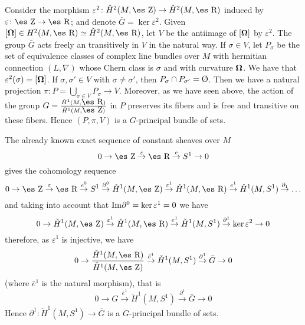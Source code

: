 \documentclass[12pt]{article}
\theoremstyle{plain}
\def\dst{\(}
\def\map#1{\mathrel{\mathop{\to}\limits^{#1}}}
\def\buit{\hbox{\rm\O}}
\def\curv{{\bf \Omega}}
\def\Zahl{\mbox{\es Z}}
\def\Real{\mbox{\es R}}
\begin{document}
Consider the morphism
$\varepsilon^2 \colon \check H^2(M,\Zahl ) \to \check H^2(M,\Real )$
induced by $\varepsilon \colon \Zahl \to \Real$;
and denote $\bar G = \ker \varepsilon^2$.
Given $[\curv ] \in H^2(M,\Real ) \simeq \check H^2(M,\Real )$,
let $V$ be the antiimage of $[\curv ]$ by $\varepsilon^2$.
The group $\bar G$ acts freely an transitively in $V$ in the natural
way.
If $\sigma \in V$, let $P_\sigma$ be
the set of equivalence classes of complex line bundles
over $M$ with hermitian connection $(L,\nabla )$
whose Chern class is $\sigma$ and with curvature $\curv$.
We have that $\varepsilon^2(\sigma ) = [\curv ]$.
If $\sigma , \sigma' \in V$ with $\sigma \not= \sigma'$,
then $P_\sigma \cap P_{\sigma'} = \buit$.
Then we have a natural projection
$\pi \colon P = \bigcup_{\sigma \in V}P_\sigma \to V$.
Moreover, as we have seen above, the action of the group
\dst G =\frac{\check H^1(M,\Real )}{\check H^1(M,\Zahl )}\)
in $P$ preserves its fibers and is
free and transitive on these fibers.
Hence $(P,\pi ,V)$ is a $G$-principal bundle of sets.

The already known exact sequence of constant sheaves over $M$
$$
0 \to \Zahl \map{\varepsilon} \Real \map{e} S^1 \to 0
$$
gives the cohomology sequence
$$
0 \to \Zahl \map{\varepsilon} \Real \map{e^0} S^1
\map{\partial^0}
\check H^1(M,\Zahl ) \map{\varepsilon^1}
\check H^1(M,\Real ) \map{e^1}
\check H^1(M,S^1) \map{\partial_1} \ldots
$$
and taking into account that
${\rm Im}\partial^0 = \ker \varepsilon^1 = 0$
we have
$$
0 \to \check H^1(M,\Zahl ) \map{\varepsilon^1}
\check H^1(M,\Real ) \map{e^1}
\check H^1(M,S^1) \map{\partial^1}
\ker \varepsilon^2 \to 0
$$
therefore, as $\varepsilon^1$ is injective, we have
$$
0 \to \frac{\check H^1(M,\Real )}{\check H^1(M,\Zahl )}
\map{\bar e^1} \check H^1(M,S^1) \map{\partial^1} \bar G \to 0
$$
(where $\bar e^1$ is the natural morphism), that is
$$
0 \to G \map{\bar e^1} \check H^1(M,S^1) \map{\partial^1} \bar G \to 0
$$
Hence $\partial^1 \colon \check H^1(M,S^1) \to \bar G$
is a $G$-principal bundle of sets.
\end{document}
